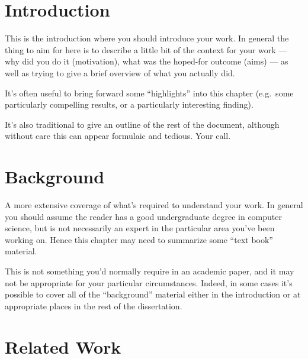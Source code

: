 \documentclass[a4paper,12pt,twoside,openright]{report}
\begin{document}
\pagestyle{empty}
\singlespacing

\onehalfspacing

\singlespacing


\setcounter{page}{0}
\pagestyle{plain}
\tableofcontents
\listoffigures
\listoftables

\onehalfspacing


\chapter{Introduction}
\setcounter{page}{1}

This is the introduction where you should introduce your work.  In
general the thing to aim for here is to describe a little bit of the
context for your work --- why did you do it (motivation), what was the
hoped-for outcome (aims) --- as well as trying to give a brief
overview of what you actually did.

It's often useful to bring forward some ``highlights'' into
this chapter (e.g.\ some particularly compelling results, or
a particularly interesting finding).

It's also traditional to give an outline of the rest of the
document, although without care this can appear formulaic
and tedious. Your call.


\chapter{Background}

A more extensive coverage of what's required to understand your
work. In general you should assume the reader has a good undergraduate
degree in computer science, but is not necessarily an expert in
the particular area you've been working on. Hence this chapter
may need to summarize some ``text book'' material.

This is not something you'd normally require in an academic paper,
and it may not be appropriate for your particular circumstances.
Indeed, in some cases it's possible to cover all of the ``background''
material either in the introduction or at appropriate places in
the rest of the dissertation.


\chapter{Related Work}
\end{document}
